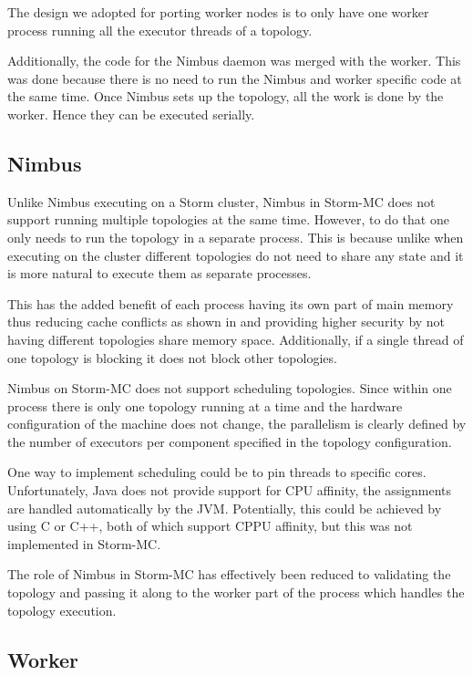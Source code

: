 The design we adopted for porting worker nodes is to only have one worker process running all the executor threads of a topology.

Additionally, the code for the Nimbus daemon was merged with the worker. This was done because there is no need to run the Nimbus and worker specific code at the same time. Once Nimbus sets up the topology, all the work is done by the worker. Hence they can be executed serially.

\subsection{Nimbus}

Unlike Nimbus executing on a Storm cluster, Nimbus in Storm-MC does not support running multiple topologies at the same time. However, to do that one only needs to run the topology in a separate process. This is because unlike when executing on the cluster different topologies do not need to share any state and it is more natural to execute them as separate processes.

This has the added benefit of each process having its own part of main memory thus reducing cache conflicts as shown in \cite{Chandra:2005:PIC:1042442.1043432} and providing higher security by not having different topologies share memory space. Additionally, if a single thread of one topology is blocking it does not block other topologies.

Nimbus on Storm-MC does not support scheduling topologies. Since within one process there is only one topology running at a time and the hardware configuration of the machine does not change, the parallelism is clearly defined by the number of executors per component specified in the topology configuration.

One way to implement scheduling could be to pin threads to specific cores. Unfortunately, Java does not provide support for CPU affinity, the assignments are handled automatically by the JVM. Potentially, this could be achieved by using C or C++, both of which support CPPU affinity, but this was not implemented in Storm-MC.

The role of Nimbus in Storm-MC has effectively been reduced to validating the topology and passing it along to the worker part of the process which handles the topology execution.

\subsection{Worker}

